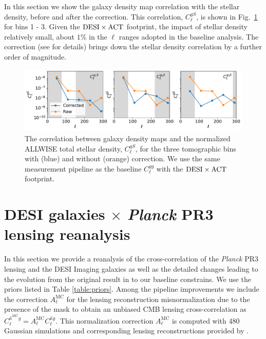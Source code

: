 \documentclass[twocolumn]{aastex631}
\begin{document}
{In this section we show the galaxy density map correlation with the stellar density, before and after the correction. This correlation, $C_{\ell}^{gS}$, is shown in Fig.~\ref{fig.stellar} for bins 1 - 3. Given the ${\rm DESI}\times{\rm ACT}$ footprint, the impact of stellar density relatively small, about $1\%$ in the $\ell$ ranges adopted in the baseline analysis. The correction (see \cite{hang2021} for details) brings down the stellar density correlation by a further order of magnitude.

\begin{figure}
    \centering
    \includegraphics[width=\linewidth]{figures/galaxy-stellar-dens-correlation.pdf}
    \caption{The correlation between galaxy density maps and the normalized ALLWISE total stellar density, $C_{\ell}^{gS}$, for the three tomographic bins with (blue) and without (orange) correction. We use the same measurement pipeline as the baseline $C_{\ell}^{gg}$ with the ${\rm DESI}\times{\rm ACT}$ footprint.} \label{fig.stellar}
\end{figure}

\section{DESI galaxies $\times$ \textit{Planck} PR3 lensing reanalysis} \label{sec. planck}
In this section we provide a reanalysis of the cross-correlation of the \textit{Planck} PR3 lensing and the DESI Imaging galaxies as well as the detailed changes leading to the evolution from 
the original result in \citep{hang2021} to our baseline constrains. We use the priors listed in Table \ref{table:priors}. Among the pipeline improvements we include the correction $A^\mathrm{MC}_\ell$ for the lensing reconstruction misnormalization due to the presence of the mask to obtain an unbiased CMB lensing cross-correlation as $C^{\hat{\kappa}^{\mathrm{MC}}g}_\ell=A^\mathrm{MC}_{\ell}C^{\hat{\kappa}g}_\ell$. This normalization correction $A^\mathrm{MC}_{\ell}$ is computed with 480 Gaussian simulations and corresponding lensing reconstructions provided by \cite{Carron:2022}.



}
\end{document}
